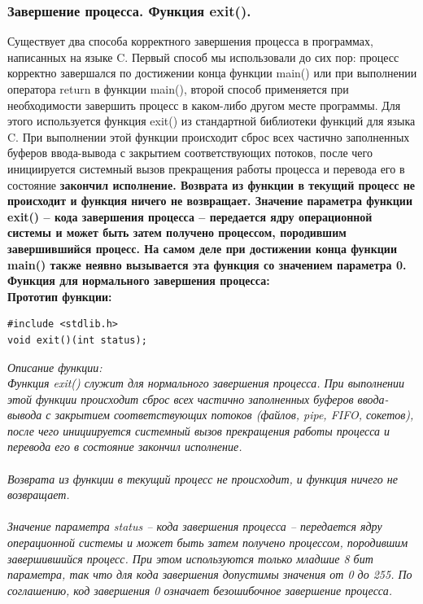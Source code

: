 \documentclass[a4paper]{article}
\begin{document}
\subsubsection{\Large Завершение процесса. Функция exit().}
Существует два способа корректного завершения процесса в программах, написанных на языке C. Первый способ мы использовали до сих пор: процесс корректно завершался по достижении конца функции main() или при выполнении оператора return в функции main(), второй способ применяется при необходимости завершить процесс в каком-либо другом месте программы. Для этого используется функция exit() из стандартной библиотеки функций для языка C. При выполнении этой функции происходит сброс всех частично заполненных буферов ввода-вывода с закрытием соответствующих потоков, после чего инициируется системный вызов прекращения работы процесса
и перевода его в состояние \bf закончил исполнение.
\rm Возврата из функции в текущий процесс не происходит и функция ничего не возвращает. Значение параметра функции exit() – кода завершения процесса – передается ядру операционной системы и может быть затем получено процессом, породившим завершившийся процесс. На самом деле при достижении конца функции main() также неявно вызывается эта функция со значением параметра 0.
Функция для нормального завершения процесса:\\
Прототип функции:
\begin{verbatim}
#include <stdlib.h>
void exit()(int status);
\end{verbatim}
\sl Описание функции:\\
\rm Функция exit() служит для нормального завершения процесса. При выполнении этой функции происходит сброс всех частично заполненных буферов ввода-вывода с закрытием соответствующих потоков (файлов, pipe, FIFO, сокетов), после чего инициируется системный вызов прекращения работы процесса и перевода его в состояние закончил исполнение. \\\\
Возврата из функции в текущий процесс не происходит, и функция ничего не возвращает. \\\\
Значение параметра status – кода завершения процесса – передается ядру операционной системы и может быть затем получено процессом, породившим завершившийся процесс. При этом используются только младшие 8 бит параметра, так что для кода завершения допустимы значения от 0 до 255. По соглашению, код завершения 0 означает безошибочное завершение процесса.\\\\
\end{document}
